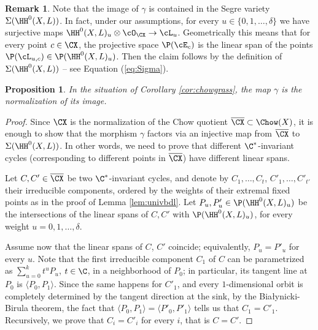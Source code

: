 \documentclass[reqno]{amsproc}
\newtheorem{proposition}[theorem]{Proposition}
\theoremstyle{definition}
\newtheorem{remark}[theorem]{Remark}
\begin{document}
\begin{remark}\label{rem:Sigma}
Note that the image of $\gamma$ is contained in the Segre variety $\Sigma(\HH^0(X,L))$. In fact, under our assumptions, for every $u\in\{0,1,\dots,\delta\}$ we have surjective maps $\HH^0(X,L)_u\otimes \cO_{\CX}\to \cL_u$. Geometrically this means that for every point $c\in\CX$, the projective space $\P(\cE_c)$ is the linear span of the points $\P(\cL_{u,c})\in\P(\HH^0(X,L)_u)$. Then the claim follows by the definition of $\Sigma(\HH^0(X,L))$ -- see Equation (\ref{eq:Sigma}). 
\end{remark}

\begin{proposition}\label{prop:normal}
In the situation of Corollary \ref{cor:chowgrass}, the map $\gamma$ is the normalization of its image.
\end{proposition}

\begin{proof}
Since $\CX$ is the normalization of the Chow quotient   $\overline{\CX}\subset\Chow(X)$, it is enough to show that the morphism $\gamma$ factors via an injective map from $\overline{\CX}$ to $\Sigma(\HH^0(X,L))$. In other words, we need to prove that different $\C^*$-invariant cycles (corresponding to different points in $\overline{\CX}$) have different linear spans.

Let $C,C'\in\overline{\CX}$ be two $\C^*$-invariant cycles, and denote by $C_1,\dots ,C_t
$, $C'_1,\dots ,C'_{t'}$ their irreducible components, ordered by the weights of their extremal fixed points as in the proof of Lemma \ref{lem:univbdl}. Let $P_u, P'_u\in\P(\HH^0(X,L)_u)$ be the intersections of the linear spans of $C,C'$ with $\P(\HH^0(X,L)_u)$, for every weight $u=0,1,\dots,\delta$. 


Assume now that the linear spans of $C$, $C'$ coincide; equivalently,  $P_u=P'_u$ for every $u$. Note that the first irreducible component $C_1$ of $C$ can be parametrized as $\sum_{u=0}^{k}t^uP_u$, $t\in\C$, in a neighborhood of $P_0$; in particular, its tangent line at $P_0$ is $\langle P_0,P_1\rangle$. Since the same happens for $C'_1$, and every $1$-dimensional orbit is completely determined by the tangent direction  at the sink, by the Bia{\l}ynicki-Birula theorem, the fact that $\langle P_0,P_1\rangle=\langle P'_0,P'_1\rangle$ tells us that $C_1=C'_1$. Recursively, we prove that $C_i=C'_i$ for every $i$, that is $C=C'$.
\end{proof}

\end{document}
